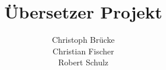 \documentclass[12pt]{amsart}
\title{Übersetzer Projekt}
\author{Christoph Brücke \\
	Christian Fischer\\
	Robert Schulz}
\date{} %
\begin{document}
\maketitle
\tableofcontents

\section{}
\subsection{}
\end{document}
